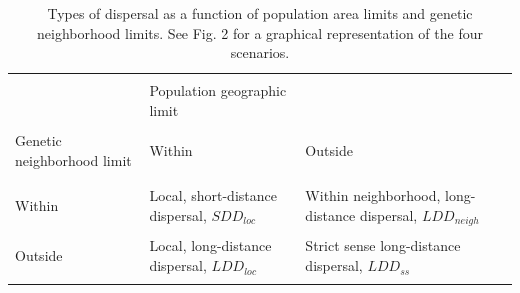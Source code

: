 \documentclass[a4paper, 12pt]{article}
\begin{document}



\newpage

\pagestyle{empty}
\begin{landscape}
	\headheight     3cm
\begin{table}
\captionsetup{width=20cm}%
\caption{Types of dispersal as a function of population area limits and genetic neighborhood limits. See Fig. 2 for a graphical representation of the four scenarios.}
\vspace{0.5cm}
  \begin{tabular}{lll}
    \hline
\\&Population geographic limit    &  \\\\
Genetic neighborhood limit     &Within &Outside \\\\
    \hline
\\Within    &  Local, short-distance \linebreak dispersal, $SDD_{loc}$  
          &  Within neighborhood, \linebreak long-distance dispersal, $LDD_{neigh}$ \\\\
Outside   &     Local, long-distance \linebreak dispersal, $LDD_{loc}$    
          &  Strict sense \linebreak long-distance dispersal, $LDD_{ss}$\\\\ 
    \hline
  \end{tabular}
\end{table}
\end{landscape}
\end{document}
